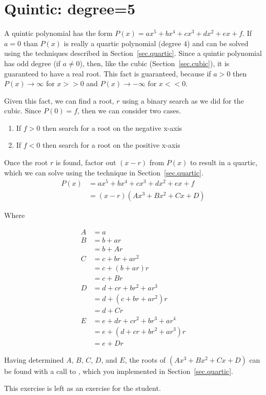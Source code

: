 \section{Quintic: degree=5}
\label{sec.quintic}

A quintic polynomial has the form $P(x) = a x^5 + b x^4 + c x^3 + d x^2 + e x + f$.
If $a=0$ than $P(x)$ is really
a quartic polynomial (degree 4) and can be solved using the techniques described in Section~\ref{sec.quartic}.
Since a quintic polynomial has odd degree (if $a\neq 0$),
then, like the cubic (Section~\ref{sec.cubic}), it is guaranteed to have a real root.  This fact
is guaranteed, because if
$a>0$ then $P(x)\to \infty$ for $x>>0$ and $P(x)\to -\infty$ for $x<<0$.

Given this fact, we can find a root, $r$ using a binary search as we did for the cubic.
Since $P(0) = f$, then we can consider two cases.
\begin{enumerate}
\item If $f>0$ then search for a root on the negative x-axis
\item If $f<0$ then search for a root on the positive x-axis
\end{enumerate}

Once the root $r$ is found, factor out $(x-r)$ from $P(x)$ to result in a quartic, which we can solve using
the technique in Section~\ref{sec.quartic}.
\begin{align*}
  P(x) &= a x^5 + b x^4 + c x^3 + d x^2 + e x + f\\
  &= (x - r) (Ax^3 + Bx^2 + Cx + D)
\end{align*}

Where

\begin{align*}
  A &= a\\
  B &= b + a r\\
   &= b + A r\\
  C &= c + b r + a r^2\\
  &= c + (b + a r)r\\
  &= c + B r\\
  D &= d + c r + b r^2 + a r^3\\
  &= d + ( c + b r + a r^2)r\\
  &= d + C r\\
  E &= e + d r + c r^2 + b r^3 + a r^4\\
  &= e + ( d + c r + b r^2 + a r^3)r\\
  &= e + D r
\end{align*}


Having determined $A$, $B$, $C$, $D$, and $E$, the roots of $(Ax^3 + Bx^2 + Cx + D)$ can be
found with a call to , which you implemented in Section~\ref{sec.quartic}.

This exercise is left as an exercise for the student.
